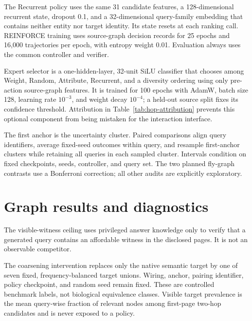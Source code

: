 \documentclass{article}
\begin{document}
The Recurrent policy uses the same 31 candidate features, a
128-dimensional recurrent state, dropout 0.1, and a 32-dimensional query-family
embedding that contains neither entity nor target identity. Its state resets at
each ranking call. REINFORCE training uses source-graph decision records for 25
epochs and 16,000 trajectories per epoch, with entropy weight 0.01. Evaluation
always uses the common controller and verifier.

Expert selector is a one-hidden-layer, 32-unit SiLU classifier that chooses
among Weight, Random, Attribute, Recurrent, and a diversity ordering using
only pre-action source-graph features. It is trained for 100 epochs with AdamW,
batch size 128, learning rate $10^{-3}$, and weight decay $10^{-4}$; a held-out
source split fixes its confidence threshold. Attribution in
Table~\ref{tab:hop-attribution} prevents this optional component from being
mistaken for the interaction interface.

The first anchor is the uncertainty cluster. Paired comparisons align query
identifiers, average fixed-seed outcomes within query, and resample first-anchor
clusters while retaining all queries in each sampled cluster. Intervals
condition on fixed checkpoints, seeds, controller, and query set. The two
planned fly-graph contrasts use a Bonferroni correction; all other audits are
explicitly exploratory.

\section{Graph results and diagnostics}
\label{app:graph-diagnostics}






The visible-witness ceiling uses privileged answer knowledge only to verify
that a generated query contains an affordable witness in the disclosed pages.
It is not an observable competitor.


The coarsening intervention replaces only the native semantic target by one of
seven fixed, frequency-balanced target unions. Wiring, anchor, pairing identifier,
policy checkpoint, and random seed remain fixed. These are controlled benchmark
labels, not biological equivalence classes. Visible target prevalence is the
mean query-wise fraction of relevant nodes among first-page two-hop candidates
and is never exposed to a policy.

\end{document}
